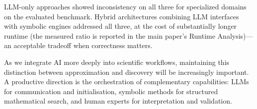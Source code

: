 \documentclass[twoside,11pt]{article}
\begin{document}
LLM-only approaches showed inconsistency on all three for specialized domains on the evaluated benchmark. Hybrid architectures combining LLM interfaces with symbolic engines addressed all three, at the cost of substantially longer runtime (the measured ratio is reported in the main paper's Runtime Analysis)---an acceptable tradeoff when correctness matters.

As we integrate AI more deeply into scientific workflows, maintaining this distinction between approximation and discovery will be increasingly important. A productive direction is the orchestration of complementary capabilities: LLMs for communication and initialisation, symbolic methods for structured mathematical search, and human experts for interpretation and validation.







\end{document}
